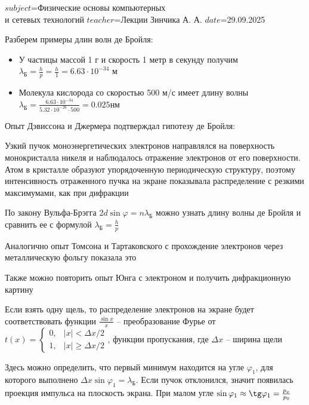$subject$=Физические основы компьютерных \\ и сетевых технологий
$teacher$=Лекции Зинчика А. А.
$date$=29.09.2025

Разберем примеры длин волн де Бройля:

\begin{itemize}
    \item У частицы массой 1 г и скорость 1 метр в секунду получим $\lambda_{\text{Б}} = \frac{h}{p} = \frac{h}{1} = 6.63 \cdot 10^{-34}$ м

    \item Молекула кислорода со скоростью 500 м/с имеет длину волны $\lambda_{\text{Б}} = \frac{6.63 \cdot 10^{-34}}{5.32 \cdot 10^{-26} \cdot 500} = 0.025 \text{нм}$
\end{itemize}

Опыт Дэвиссона и Джермера подтверждал гипотезу де Бройля:

Узкий пучок моноэнергетических электронов направлялся на поверхность монокристалла никеля и наблюдалось отражение электронов от его поверхности. Атом в кристалле образуют упорядоченную периодическую структуру, поэтому интенсивность отраженного пучка на экране показывала распределение с резкими максимумами, как при дифракции

По закону Вульфа-Брэгга $2d \sin \varphi = n \lambda_{\text{Б}}$ можно узнать длину волны де Бройля и сравнить ее с формулой $\lambda_{\text{Б}} = \frac{h}{p}$


Аналогично опыт Томсона и Тартаковского с прохождение электронов через металлическую фольгу показала это

Также можно повторить опыт Юнга с электроном и получить дифракционную картину


Если взять одну щель, то распределение электронов на экране будет соответствовать функции $\frac{\sin x}{x}$ -- преобразование Фурье от $t(x) = \begin{cases}0, & |x| < \Delta x / 2 \\ 1, & |x| \geq \Delta x / 2 \end{cases}$, функции пропускания, где $\Delta x$ -- ширина щели

Здесь можно определить, что первый минимум находится на угле $\varphi_1$, для которого выполнено $\Delta x \sin \varphi_1 = \lambda_{\text{Б}}$. Если пучок отклонился, значит появилась проекция импульса на плоскость экрана. При малом угле $\sin \varphi_1 \approx \tg \varphi_1 = \frac{p_x}{p_0}$

